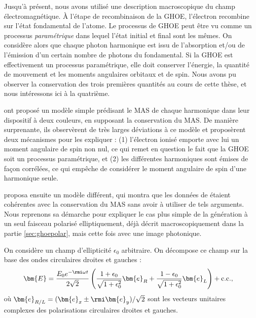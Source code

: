 Jusqu'à présent, nous avons utilisé une description macroscopique du champ électromagnétique. \`A l'étape de recombinaison de la GHOE, l'électron recombine sur l'état fondamental de l'atome. Le processus de GHOE peut être vu comme un processus \textit{paramétrique} dans lequel l'état initial et final sont les mêmes. On considère alors que chaque photon harmonique est issu de l'absorption et/ou de l'émission d'un certain nombre de photons du fondamental. Si la GHOE est effectivement un processus paramétrique, elle doit conserver l'énergie, la quantité de mouvement et les moments angulaires orbitaux et de spin. Nous avons pu observer la conservation des trois premières quantités au cours de cette thèse, et nous intéressons ici à la quatrième.

 ont proposé un modèle simple prédisant le MAS de chaque harmonique dans leur dispositif à deux couleurs, en supposant la conservation du MAS. De manière surprenante, ils observèrent de très larges déviations à ce modèle et proposèrent deux mécanismes pour les expliquer : (1) l'électron ionisé emporte avec lui un moment angulaire de spin non nul, ce qui remet en question le fait que la GHOE soit un processus paramétrique, et (2) les différentes harmoniques sont émises de façon corrélées, ce qui empêche de considérer le moment angulaire de spin d'une harmonique seule.\par
{} proposa ensuite un modèle différent, qui montra que les données de  étaient cohérentes avec la conservation du MAS sans avoir à utiliser de tels arguments. Nous reprenons sa démarche pour expliquer le cas plus simple de la génération à un seul faisceau polarisé elliptiquement, déjà décrit macroscopiquement dans la partie \ref{sec:ghoepolar}, mais cette fois avec une image photonique.

On considère un champ d'ellipticité $\epsilon_0$ arbitraire. On décompose ce champ sur la base des ondes circulaires droites et gauches :
\begin{equation}
\bm{E} = \frac{E_0 e^{-\rmi\omega t}}{2\sqrt{2}}\left(\frac{1+\epsilon_0}{\sqrt{1+\epsilon_0^2}}\bm{e}_R+\frac{1-\epsilon_0}{\sqrt{1+\epsilon_0^2}}\bm{e}_L\right)+\text{c.c.},
\label{eq:Eell_RL}
\end{equation}
où $\bm{e}_{R/L}=(\bm{e}_x\pm\rmi\bm{e}_y)/\sqrt{2}$ sont les vecteurs unitaires complexes des polarisations circulaires droites et gauches.

